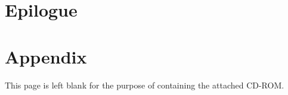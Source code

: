 \part{Epilogue}
\clearpage{\thispagestyle{empty}\cleardoublepage}

\clearpage{\thispagestyle{empty}\cleardoublepage}

\clearpage{\thispagestyle{empty}\cleardoublepage}


\clearpage{\thispagestyle{empty}\cleardoublepage}

\part{Appendix}
\clearpage{\thispagestyle{empty}\cleardoublepage}




\label{bib}

\cleardoublepage
\thispagestyle{empty}
\vspace*{4cm}
\label{cd}
{\centering This page is left blank for the purpose of containing the attached CD-ROM.}

